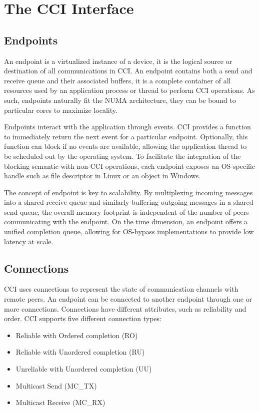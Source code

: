 \section{The CCI Interface}

\subsection{Endpoints}
An endpoint is a virtualized instance of a device, it is the logical source 
or destination of all communications in CCI. An endpoint contains both a send 
and receive queue and their associated buffers, it is a complete container 
of all resources used by an application process or thread to perform CCI 
operations. As such, endpoints naturally fit the NUMA architecture, they can 
be bound to particular cores to maximize locality.

Endpoints interact with the application through events. CCI provides a 
function to immediately return the next event for a particular endpoint. 
Optionally, this function can block if no events are available, allowing the 
application thread to be scheduled out by the operating system. To facilitate 
the integration of the blocking semantic with non-CCI operations, each endpoint 
exposes an OS-specific handle such as file descriptor in Linux or an object in 
Windows.

The concept of endpoint is key to scalability. By multiplexing incoming 
messages into a shared receive queue and similarly buffering outgoing 
messages in a shared send queue, the overall memory footprint is independent 
of the number of peers communicating with the endpoint. On the time dimension, 
an endpoint offers a unified completion queue, allowing for OS-bypass 
implementations to provide low latency at scale.

\subsection{Connections}
CCI uses connections to represent the state of communication channels with 
remote peers. An endpoint can be connected to another endpoint through one or 
more connections. Connections have different attributes, such as 
reliability and order. CCI supports five different connection types:

\begin{itemize}
\item Reliable with Ordered completion (RO)
\item Reliable with Unordered completion (RU)
\item Unreliable with Unordered completion (UU)
\item Multicast Send (MC\_TX)
\item Multicast Receive (MC\_RX)
\end{itemize}

